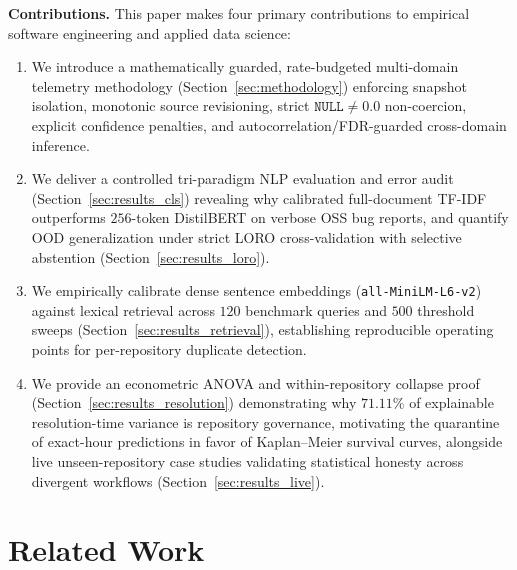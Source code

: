 \documentclass[conference]{IEEEtran}
\begin{document}
\textbf{Contributions.} This paper makes four primary contributions to empirical software engineering and applied data science:
\begin{enumerate}
    \item We introduce a mathematically guarded, rate-budgeted multi-domain telemetry methodology (Section~\ref{sec:methodology}) enforcing snapshot isolation, monotonic source revisioning, strict $\texttt{NULL}\neq 0.0$ non-coercion, explicit confidence penalties, and autocorrelation/FDR-guarded cross-domain inference.
    \item We deliver a controlled tri-paradigm NLP evaluation and error audit (Section~\ref{sec:results_cls}) revealing why calibrated full-document TF-IDF outperforms $256$-token DistilBERT on verbose OSS bug reports, and quantify OOD generalization under strict LORO cross-validation with selective abstention (Section~\ref{sec:results_loro}).
    \item We empirically calibrate dense sentence embeddings (\texttt{all-MiniLM-L6-v2}) against lexical retrieval across $120$ benchmark queries and $500$ threshold sweeps (Section~\ref{sec:results_retrieval}), establishing reproducible operating points for per-repository duplicate detection.
    \item We provide an econometric ANOVA and within-repository collapse proof (Section~\ref{sec:results_resolution}) demonstrating why $71.11\%$ of explainable resolution-time variance is repository governance, motivating the quarantine of exact-hour predictions in favor of Kaplan--Meier survival curves, alongside live unseen-repository case studies validating statistical honesty across divergent workflows (Section~\ref{sec:results_live}).
\end{enumerate}

\section{Related Work}
\end{document}
